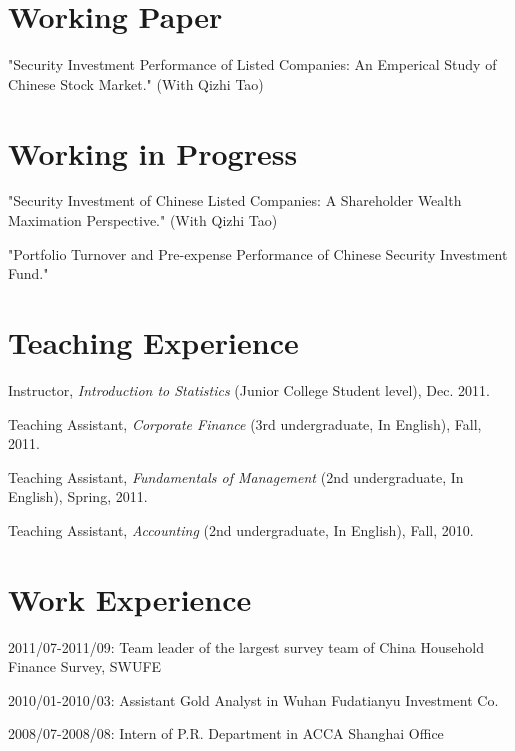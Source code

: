 \documentclass[letterpaper]{article}
\renewenvironment{itemize}{
  \begin{list}{}{
    \setlength{\leftmargin}{1.5em}
    \setlength{\itemsep}{0pt}
  }
}{
  \end{list}
}
\begin{document}
\section*{Working Paper}
\begin{itemize}
\item "Security Investment Performance of Listed Companies: An Emperical Study of Chinese Stock Market." (With Qizhi Tao)
\end{itemize}

\section*{Working in Progress}
\begin{itemize}
\item "Security Investment of Chinese Listed Companies: A Shareholder Wealth Maximation Perspective." (With Qizhi Tao)
\item "Portfolio Turnover and Pre-expense Performance of Chinese Security Investment Fund." 
\end{itemize}

\section*{Teaching Experience}
\begin{itemize}
\item Instructor, {\it Introduction to Statistics} (Junior College Student level), Dec. 2011.
\item Teaching Assistant, {\it Corporate Finance} (3rd undergraduate, In English), Fall, 2011.
\item Teaching Assistant, {\it Fundamentals of Management} (2nd undergraduate, In English), Spring, 2011.
\item Teaching Assistant, {\it Accounting} (2nd undergraduate, In English), Fall, 2010.
\end{itemize}

\section*{Work Experience}
\begin{itemize}
\item 2011/07-2011/09: Team leader of the largest survey team of China Household Finance Survey, SWUFE
\item 2010/01-2010/03: Assistant Gold Analyst in Wuhan Fudatianyu Investment Co.
\item 2008/07-2008/08: Intern of P.R. Department in ACCA Shanghai Office
\end{itemize}
\end{document}

